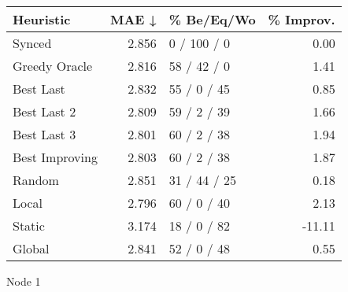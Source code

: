 \begin{tabular}{lrlr}
\toprule
\textbf{Heuristic} & \textbf{MAE ↓} & \textbf{\% Be/Eq/Wo} & \textbf{\% Improv.} \\
\midrule
            Synced &          2.856 &          0 / 100 / 0 &                0.00 \\
     Greedy Oracle &          2.816 &          58 / 42 / 0 &                1.41 \\
         Best Last &          2.832 &          55 / 0 / 45 &                0.85 \\
       Best Last 2 &          2.809 &          59 / 2 / 39 &                1.66 \\
       Best Last 3 &          2.801 &          60 / 2 / 38 &                1.94 \\
    Best Improving &          2.803 &          60 / 2 / 38 &                1.87 \\
            Random &          2.851 &         31 / 44 / 25 &                0.18 \\
             Local &          2.796 &          60 / 0 / 40 &                2.13 \\
            Static &          3.174 &          18 / 0 / 82 &              -11.11 \\
            Global &          2.841 &          52 / 0 / 48 &                0.55 \\
\bottomrule
\end{tabular}
\caption{Node 1}
\label{tab:ds_non_lr01_le2_bs4_1}
